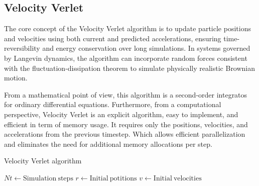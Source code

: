 \subsection{Velocity Verlet}

The core concept of the Velocity Verlet algorithm is to update particle positions and velocities using both current and predicted accelerations, ensuring time-reversibility and energy conservation over long simulations. 
In systems governed by Langevin dynamics, the algorithm can incorporate random forces consistent with the fluctuation-dissipation theorem to simulate physically realistic Brownian motion.

From a mathematical point of view, this algorithm is a second-order integratos for ordinary differential equations.
Furthermore, from a computational perspective, Velocity Verlet is an explicit algorithm, easy to implement, and efficient in term of memory usage.
It requires only the positions, velocities, and accelerations from the previous timestep.
Which allows efficient parallelization and eliminates the need for additional memory allocations per step.

\begin{algorithm}
\caption{Velocity Verlet algorithm}\label{alg:two}
$Nt \gets \mathrm{Simulation~steps}$\;
$r \gets \mathrm{Initial~potitions}$\;
$v \gets \mathrm{Initial~velocities}$\;
\end{algorithm}



